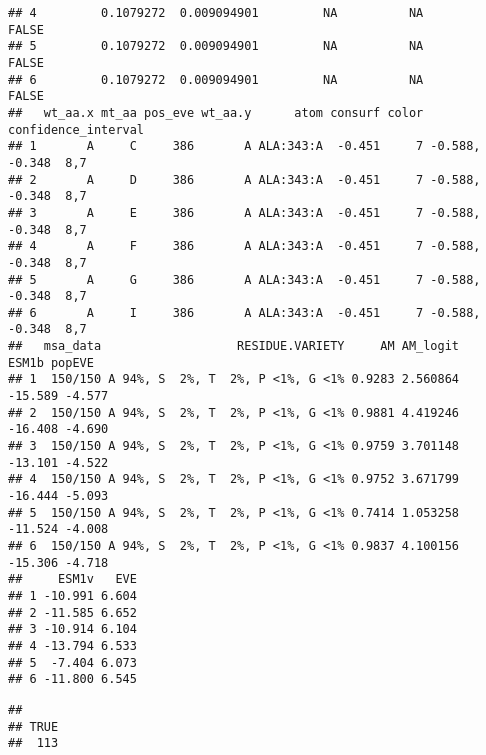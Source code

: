 \documentclass[
]{article}
\newenvironment{Shaded}{\begin{snugshade}}{\end{snugshade}}
\newcommand{\FunctionTok}[1]{\textcolor[rgb]{0.13,0.29,0.53}{\textbf{#1}}}
\newcommand{\NormalTok}[1]{#1}
\newcommand{\SpecialCharTok}[1]{\textcolor[rgb]{0.81,0.36,0.00}{\textbf{#1}}}
\begin{document}
\begin{verbatim}
## 4         0.1079272  0.009094901         NA          NA               FALSE
## 5         0.1079272  0.009094901         NA          NA               FALSE
## 6         0.1079272  0.009094901         NA          NA               FALSE
##   wt_aa.x mt_aa pos_eve wt_aa.y      atom consurf color confidence_interval
## 1       A     C     386       A ALA:343:A  -0.451     7 -0.588, -0.348  8,7
## 2       A     D     386       A ALA:343:A  -0.451     7 -0.588, -0.348  8,7
## 3       A     E     386       A ALA:343:A  -0.451     7 -0.588, -0.348  8,7
## 4       A     F     386       A ALA:343:A  -0.451     7 -0.588, -0.348  8,7
## 5       A     G     386       A ALA:343:A  -0.451     7 -0.588, -0.348  8,7
## 6       A     I     386       A ALA:343:A  -0.451     7 -0.588, -0.348  8,7
##   msa_data                   RESIDUE.VARIETY     AM AM_logit   ESM1b popEVE
## 1  150/150 A 94%, S  2%, T  2%, P <1%, G <1% 0.9283 2.560864 -15.589 -4.577
## 2  150/150 A 94%, S  2%, T  2%, P <1%, G <1% 0.9881 4.419246 -16.408 -4.690
## 3  150/150 A 94%, S  2%, T  2%, P <1%, G <1% 0.9759 3.701148 -13.101 -4.522
## 4  150/150 A 94%, S  2%, T  2%, P <1%, G <1% 0.9752 3.671799 -16.444 -5.093
## 5  150/150 A 94%, S  2%, T  2%, P <1%, G <1% 0.7414 1.053258 -11.524 -4.008
## 6  150/150 A 94%, S  2%, T  2%, P <1%, G <1% 0.9837 4.100156 -15.306 -4.718
##     ESM1v   EVE
## 1 -10.991 6.604
## 2 -11.585 6.652
## 3 -10.914 6.104
## 4 -13.794 6.533
## 5  -7.404 6.073
## 6 -11.800 6.545
\end{verbatim}

\begin{Shaded}
\end{Shaded}

\begin{verbatim}
## 
## TRUE 
##  113
\end{verbatim}
\end{document}
